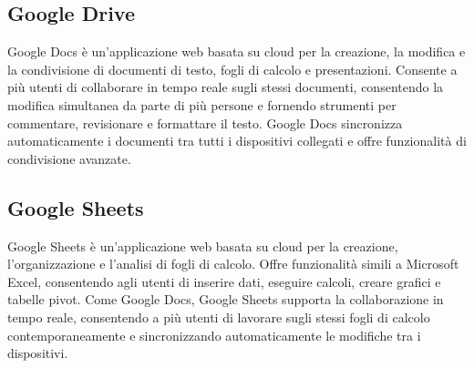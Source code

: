 \vspace{2em}
\subsection*{Google Drive}
Google Docs è un'applicazione web basata su cloud per la creazione, la modifica e la condivisione di documenti di testo, fogli di calcolo e presentazioni. Consente a più utenti di collaborare in tempo reale sugli stessi documenti, consentendo la modifica simultanea da parte di più persone e fornendo strumenti per commentare, revisionare e formattare il testo. Google Docs sincronizza automaticamente i documenti tra tutti i dispositivi collegati e offre funzionalità di condivisione avanzate.

\vspace{2em}
\subsection*{Google Sheets}
Google Sheets è un'applicazione web basata su cloud per la creazione, l'organizzazione e l'analisi di fogli di calcolo. Offre funzionalità simili a Microsoft Excel, consentendo agli utenti di inserire dati, eseguire calcoli, creare grafici e tabelle pivot. Come Google Docs, Google Sheets supporta la collaborazione in tempo reale, consentendo a più utenti di lavorare sugli stessi fogli di calcolo contemporaneamente e sincronizzando automaticamente le modifiche tra i dispositivi.
